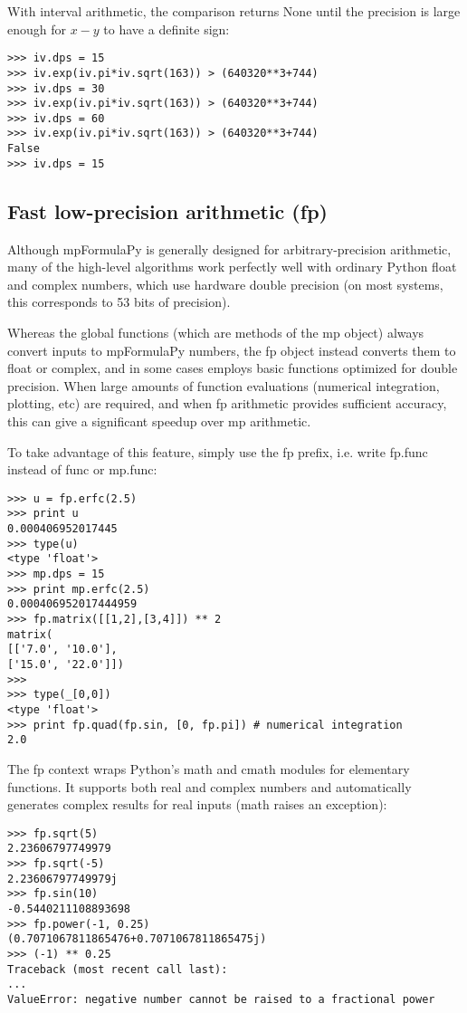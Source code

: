 With interval arithmetic, the comparison returns None until the precision is large enough for $x-y$ to have a definite sign:

\begin{lstlisting}
>>> iv.dps = 15
>>> iv.exp(iv.pi*iv.sqrt(163)) > (640320**3+744)
>>> iv.dps = 30
>>> iv.exp(iv.pi*iv.sqrt(163)) > (640320**3+744)
>>> iv.dps = 60
>>> iv.exp(iv.pi*iv.sqrt(163)) > (640320**3+744)
False
>>> iv.dps = 15
\end{lstlisting}


\subsection{Fast low-precision arithmetic (fp)}  

Although mpFormulaPy is generally designed for arbitrary-precision arithmetic, many of the high-level algorithms work perfectly well with ordinary Python float and complex numbers, which use hardware double precision (on most systems, this corresponds to 53 bits of precision). 

Whereas the global functions (which are methods of the mp object) always
convert inputs to mpFormulaPy numbers, the fp object instead converts them to float or complex, and in some cases employs basic functions optimized for double precision. When large amounts of function evaluations (numerical integration, plotting, etc) are required, and when
fp arithmetic provides sufficient accuracy, this can give a significant speedup over mp arithmetic.

\vpara
To take advantage of this feature, simply use the fp prefix, i.e. write fp.func instead of func or mp.func:

\begin{lstlisting}
>>> u = fp.erfc(2.5)
>>> print u
0.000406952017445
>>> type(u)
<type 'float'>
>>> mp.dps = 15
>>> print mp.erfc(2.5)
0.000406952017444959
>>> fp.matrix([[1,2],[3,4]]) ** 2
matrix(
[['7.0', '10.0'],
['15.0', '22.0']])
>>>
>>> type(_[0,0])
<type 'float'>
>>> print fp.quad(fp.sin, [0, fp.pi]) # numerical integration
2.0
\end{lstlisting}


The fp context wraps Python's math and cmath modules for elementary functions. It supports both real and complex numbers and automatically generates complex results for real inputs (math raises an exception):

\begin{lstlisting}
>>> fp.sqrt(5)
2.23606797749979
>>> fp.sqrt(-5)
2.23606797749979j
>>> fp.sin(10)
-0.5440211108893698
>>> fp.power(-1, 0.25)
(0.7071067811865476+0.7071067811865475j)
>>> (-1) ** 0.25
Traceback (most recent call last):
...
ValueError: negative number cannot be raised to a fractional power
\end{lstlisting}


